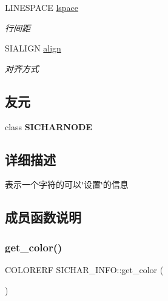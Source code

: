 \begin{DoxyCompactItemize}
\mbox{\label{class_s_i_c_h_a_r___i_n_f_o_ace4bad34a55f914a2fbbdeb8f9a22bae}} 
L\+I\+N\+E\+S\+P\+A\+CE \hyperlink{class_s_i_c_h_a_r___i_n_f_o_ace4bad34a55f914a2fbbdeb8f9a22bae}{lspace}
\begin{DoxyCompactList}\small\item\em 行间距  \end{DoxyCompactList}\item 
\mbox{\label{class_s_i_c_h_a_r___i_n_f_o_a698a16c3b045894991c8aa2982190c7e}} 
S\+I\+A\+L\+I\+GN \hyperlink{class_s_i_c_h_a_r___i_n_f_o_a698a16c3b045894991c8aa2982190c7e}{align}
\begin{DoxyCompactList}\small\item\em 对齐方式  \end{DoxyCompactList}\end{DoxyCompactItemize}
\subsection*{友元}
\begin{DoxyCompactItemize}
\item 
\mbox{\label{class_s_i_c_h_a_r___i_n_f_o_a33fe671aa658d4d9c3e3723f54dd2f31}} 
class {\bfseries S\+I\+C\+H\+A\+R\+N\+O\+DE}
\end{DoxyCompactItemize}


\subsection{详细描述}
表示一个字符的可以\char`\"{}设置\char`\"{}的信息 

\subsection{成员函数说明}
\mbox{\label{class_s_i_c_h_a_r___i_n_f_o_acd6d47c6cf5f266e18033e45763d6272}} 
\subsubsection{\texorpdfstring{get\+\_\+color()}{get\_color()}}
{\footnotesize\ttfamily C\+O\+L\+O\+R\+E\+RF S\+I\+C\+H\+A\+R\+\_\+\+I\+N\+F\+O\+::get\+\_\+color (\begin{DoxyParamCaption}{ }\end{DoxyParamCaption})\hspace{0.3cm}{\ttfamily [inline]}}



